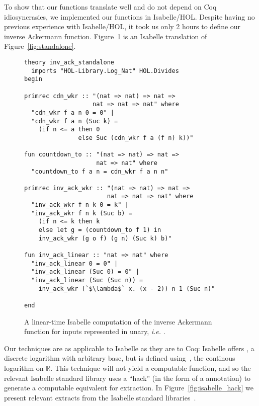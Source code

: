 To show that our functions translate well and do not 
depend on Coq idiosyncrasies,
we implemented our functions in Isabelle/HOL.  Despite having 
no previous experience with Isabelle/HOL, it took us
only 2 hours to define our inverse Ackermann function.
Figure~\ref{fig:standalone_isabelle} is an Isabelle translation of 
Figure~\ref{fig:standalone}.

\lstset{style=isaStyle}
\begin{figure}
\begin{lstlisting}
theory inv_ack_standalone
  imports "HOL-Library.Log_Nat" HOL.Divides
begin

primrec cdn_wkr :: "(nat => nat) => nat => 
                   nat => nat => nat" where
  "cdn_wkr f a n 0 = 0" |
  "cdn_wkr f a n (Suc k) = 
    (if n <= a then 0 
  	           else Suc (cdn_wkr f a (f n) k))"

fun countdown_to :: "(nat => nat) => nat => 
                    nat => nat" where
  "countdown_to f a n = cdn_wkr f a n n"

primrec inv_ack_wkr :: "(nat => nat) => nat => 
                       nat => nat => nat" where
  "inv_ack_wkr f n k 0 = k" |
  "inv_ack_wkr f n k (Suc b) = 
  	(if n <= k then k
  	else let g = (countdown_to f 1) in
    inv_ack_wkr (g o f) (g n) (Suc k) b)"

fun inv_ack_linear :: "nat => nat" where
  "inv_ack_linear 0 = 0" |
  "inv_ack_linear (Suc 0) = 0" |
  "inv_ack_linear (Suc (Suc n)) = 
  	inv_ack_wkr (`$\lambda$` x. (x - 2)) n 1 (Suc n)"
 
end
\end{lstlisting}
\caption{A linear-time Isabelle computation of the inverse Ackermann function for inputs represented in unary, \emph{i.e.} .}
\label{fig:standalone_isabelle}
\end{figure}


Our techniques are as applicable to Isabelle as they are to Coq:
Isabelle offers , a discrete logarithm with arbitrary base, but 
 is defined using~, the continous logarithm on $\mathbb{R}$.
This technique will not yield a computable function, and so the relevant 
Isabelle standard library
uses a ``hack'' (in the form of a \li{[code]} annotation) to generate a computable equivalent for extraction.
In Figure~\ref{fig:isabelle_hack} we present relevant extracts from the Isabelle standard libraries~\cite{isastan2013, isastan2019}.

